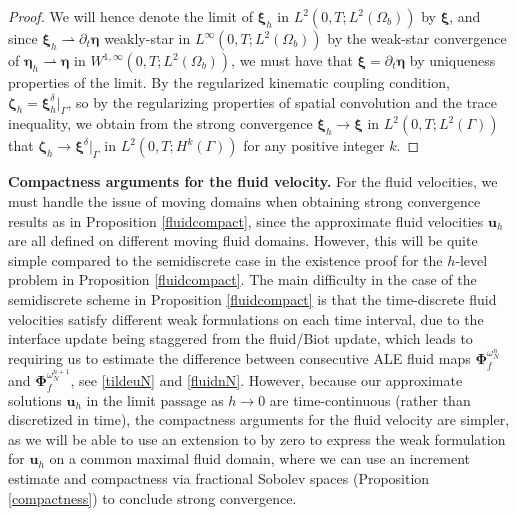 \documentclass[11pt]{article}
\newcommand{\bd}{\boldsymbol}
\theoremstyle{definition}
\begin{document}
\begin{proof}
We will hence denote the limit of $\bd{\xi}_{h}$ in $L^{2}(0, T; L^{2}(\Omega_{b}))$ by $\bd{\xi}$, and since $\bd{\xi}_{h} \rightharpoonup \partial_{t}\bd{\eta}$ weakly-star in $L^{\infty}(0, T; L^{2}(\Omega_{b}))$ by the weak-star convergence of $\bd{\eta}_{h} \rightharpoonup \bd{\eta}$ in $W^{1, \infty}(0, T; L^{2}(\Omega_{b}))$, we must have that $\bd{\xi} = \partial_{t}\bd{\eta}$ by uniqueness properties of the limit. By the regularized kinematic coupling condition, $\bd{\zeta}_{h} = \bd{\xi}_{h}^{\delta}|_{\Gamma}$, so by the regularizing properties of spatial convolution and the trace inequality, we obtain from the strong convergence $\bd{\xi}_{h} \to \bd{\xi}$ in $L^{2}(0, T; L^{2}(\Gamma))$ that $\bd{\zeta}_{h} \to \bd{\xi}^{\delta}|_{\Gamma}$ in $L^{2}(0, T; H^{k}(\Gamma))$ for any positive integer $k$. 
\end{proof}

\medskip

\noindent \textbf{Compactness arguments for the fluid velocity.} For the fluid velocities, we must handle the issue of moving domains when obtaining strong convergence results as in Proposition \ref{fluidcompact}, since the approximate fluid velocities $\bd{u}_{h}$ are all defined on different moving fluid domains. However, this will be quite simple compared to the semidiscrete case in the existence proof for the $h$-level problem in Proposition \ref{fluidcompact}. The main difficulty in the case of the semidiscrete scheme in Proposition \ref{fluidcompact} is that the time-discrete fluid velocities satisfy different weak formulations on each time interval, due to the interface update being staggered from the fluid/Biot update, which leads to requiring us to estimate the difference between consecutive ALE fluid maps $\bd{\Phi}^{\omega^{n}_{N}}_{f}$ and $\bd{\Phi}^{\omega^{n + 1}_{N}}_{f}$, see \eqref{tildeuN} and \eqref{fluidnN}. However, because our approximate solutions $\bd{u}_{h}$ in the limit passage as $h \to 0$ are time-continuous (rather than discretized in time), the compactness arguments for the fluid velocity are simpler, as we will be able to use an extension to by zero to express the weak formulation for $\bd{u}_{h}$ on a common maximal fluid domain, where we can use an increment estimate and compactness via fractional Sobolev spaces (Proposition \ref{compactness}) to conclude strong convergence. 
\end{document}
